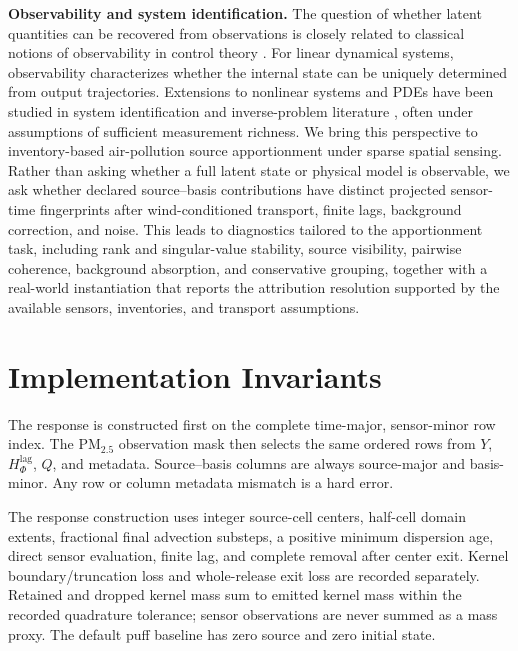 \noindent\textbf{Observability and system identification.}
The question of whether latent quantities can be recovered from observations is
closely related to classical notions of observability in control theory
\citep{chen1984linear}. For linear dynamical systems, observability characterizes
whether the internal state can be uniquely determined from output trajectories.
Extensions to nonlinear systems and PDEs have been studied in system
identification and inverse-problem literature
\citep{ljung1987theory,banks2012estimation,colton1990inverse}, often under
assumptions of sufficient measurement richness. We bring this perspective to
inventory-based air-pollution source apportionment under sparse spatial sensing.
Rather than asking whether a full latent state or physical model is observable, we
ask whether declared source--basis contributions have distinct projected
sensor-time fingerprints after wind-conditioned transport, finite lags, background
correction, and noise. This leads to diagnostics tailored to the apportionment
task, including rank and singular-value stability, source visibility, pairwise
coherence, background absorption, and conservative grouping, together with a
real-world instantiation that reports the attribution resolution supported by the
available sensors, inventories, and transport assumptions.

\section{Implementation Invariants}
\label{app:implementation_invariants}

The response is constructed first on the complete time-major, sensor-minor row
index.  The PM\(_{2.5}\) observation mask then selects the same ordered rows
from \(Y\), \(H_\Phi^{\mathrm{lag}}\), \(Q\), and metadata.  Source--basis
columns are always source-major and basis-minor.  Any row or column metadata
mismatch is a hard error.

The response construction uses integer source-cell centers, half-cell domain
extents, fractional final advection substeps, a positive minimum dispersion
age, direct sensor evaluation, finite lag, and complete removal after center
exit.  Kernel boundary/truncation loss and whole-release exit loss are recorded
separately.  Retained and dropped kernel mass sum to emitted kernel mass within
the recorded quadrature tolerance; sensor observations are never summed as a
mass proxy.  The default puff baseline has zero source and zero initial state.


